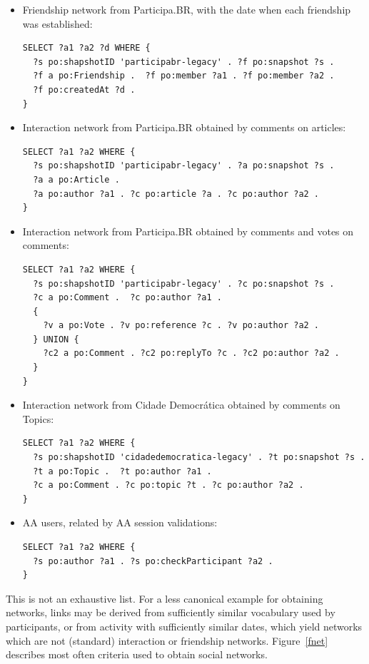 \documentclass[data,datadescriptor,submit,moreauthors,pdftex]{Definitions/mdpi}
\begin{document}
\begin{itemize}
\begin{lstlisting}[language=spq]
}
\end{lstlisting}
  \item Friendship network from Participa.BR, with the date when each friendship was established:
\begin{lstlisting}[language=spq]
SELECT ?a1 ?a2 ?d WHERE { 
  ?s po:shapshotID 'participabr-legacy' . ?f po:snapshot ?s .
  ?f a po:Friendship .  ?f po:member ?a1 . ?f po:member ?a2 .
  ?f po:createdAt ?d .
}
\end{lstlisting}
  \item Interaction network from Participa.BR obtained by comments on articles:
\begin{lstlisting}[language=spq]
SELECT ?a1 ?a2 WHERE {
  ?s po:shapshotID 'participabr-legacy' . ?a po:snapshot ?s .
  ?a a po:Article .
  ?a po:author ?a1 . ?c po:article ?a . ?c po:author ?a2 .
}
\end{lstlisting}
  \item Interaction network from Participa.BR obtained by comments and votes on comments:
\begin{lstlisting}[language=spq]
SELECT ?a1 ?a2 WHERE { 
  ?s po:shapshotID 'participabr-legacy' . ?c po:snapshot ?s .
  ?c a po:Comment .  ?c po:author ?a1 .
  {
    ?v a po:Vote . ?v po:reference ?c . ?v po:author ?a2 .
  } UNION {
    ?c2 a po:Comment . ?c2 po:replyTo ?c . ?c2 po:author ?a2 .
  }
}
\end{lstlisting}
  \item Interaction network from Cidade Democrática obtained by comments on Topics:
\begin{lstlisting}[language=spq]
SELECT ?a1 ?a2 WHERE { 
  ?s po:shapshotID 'cidadedemocratica-legacy' . ?t po:snapshot ?s .
  ?t a po:Topic .  ?t po:author ?a1 .
  ?c a po:Comment . ?c po:topic ?t . ?c po:author ?a2 .
}
\end{lstlisting}
  \item AA users, related by AA session validations:
\begin{lstlisting}[language=spq]
SELECT ?a1 ?a2 WHERE { 
  ?s po:author ?a1 . ?s po:checkParticipant ?a2 .
}
\end{lstlisting}
\end{itemize}

This is not an exhaustive list.
For a less canonical example for obtaining networks,
links may be derived from sufficiently similar vocabulary used by participants,
or from activity with sufficiently similar dates,
which yield networks which are not (standard) interaction or friendship networks.
Figure~\ref{fnet} describes most often criteria used to obtain social networks.
\end{document}
